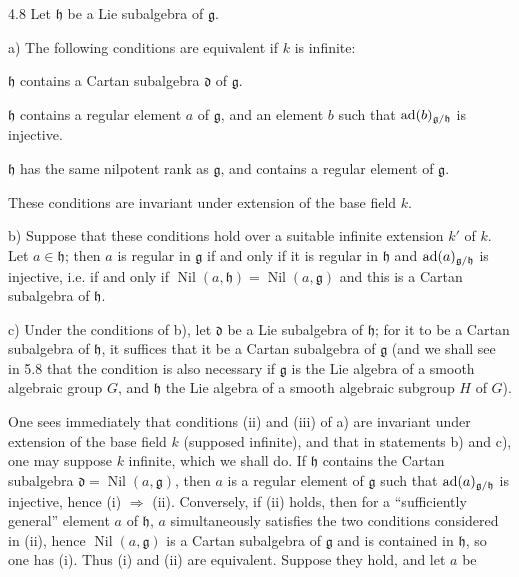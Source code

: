 \begin{proposition}{4.8}\label{XIII.4.8}
Let $\mathfrak h$ be a Lie subalgebra of $\mathfrak g$.

\noindent a) The following conditions are equivalent if $k$ is infinite:
\begin{enumeratei}
\item $\mathfrak h$ contains a Cartan subalgebra $\mathfrak d$ of
$\mathfrak g$.
\item $\mathfrak h$ contains a regular element $a$ of $\mathfrak g$,
and an element $b$ such that $\operatorname{ad}(b)_{\mathfrak g/\mathfrak h}$ is injective.
\item $\mathfrak h$ has the same nilpotent rank as $\mathfrak g$,
and contains a regular element of $\mathfrak g$.
\end{enumeratei}
These conditions are invariant under extension of the base field $k$.

\noindent b) Suppose that these conditions hold over a suitable infinite
extension $k'$ of $k$. Let $a\in\mathfrak h$; then $a$ is regular in
$\mathfrak g$ if and only if it is regular in $\mathfrak h$ and
$\operatorname{ad}(a)_{\mathfrak g/\mathfrak h}$ is injective, i.e. if and only if
$\operatorname{Nil}(a,\mathfrak h)=\operatorname{Nil}(a,\mathfrak g)$
and this is a Cartan subalgebra of $\mathfrak h$.

\noindent c) Under the conditions of b), let $\mathfrak d$ be a Lie
subalgebra of $\mathfrak h$; for it to be a Cartan subalgebra of
$\mathfrak h$, it suffices that it be a Cartan subalgebra of
$\mathfrak g$ (and we shall see in 5.8 that the condition is also
necessary if $\mathfrak g$ is the Lie algebra of a smooth algebraic
group $G$, and $\mathfrak h$ the Lie algebra of a smooth algebraic
subgroup $H$ of $G$).
\end{proposition}
One sees immediately that conditions (ii) and (iii) of a) are
invariant under extension of the base field $k$ (supposed infinite),
and that in statements b) and c), one may suppose $k$ infinite,
which we shall do. If $\mathfrak h$ contains the Cartan subalgebra
$\mathfrak d=\operatorname{Nil}(a,\mathfrak g)$, then $a$ is a regular
element of $\mathfrak g$ such that $\operatorname{ad}(a)_{\mathfrak g/\mathfrak h}$
is injective, hence (i) $\Rightarrow$ (ii). Conversely, if (ii) holds,
then for a ``sufficiently general'' element $a$ of $\mathfrak h$,
$a$ simultaneously satisfies the two conditions considered in (ii),
hence $\operatorname{Nil}(a,\mathfrak g)$ is a Cartan subalgebra of
$\mathfrak g$ and is contained in $\mathfrak h$, so one has (i).
Thus (i) and (ii) are equivalent. Suppose they hold, and let $a$ be
